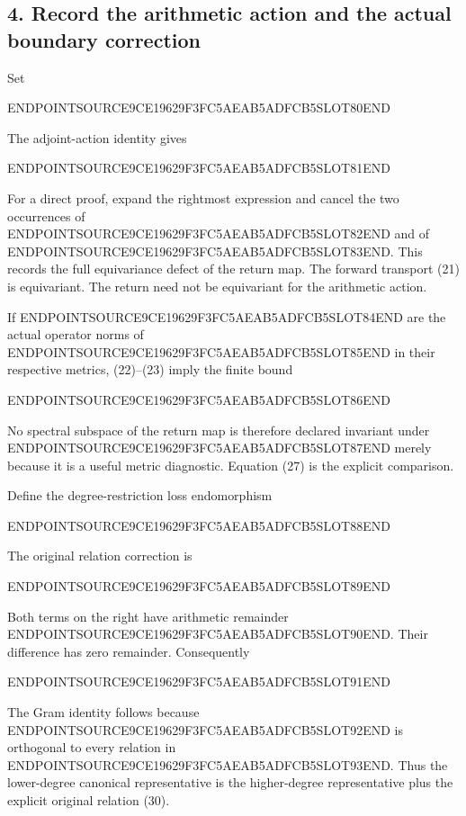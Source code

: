 \subsection{4. Record the arithmetic action and the actual boundary correction}\label{endpoint-restriction_original--record-the-arithmetic-action-and-the-actual-boundary-correction}

Set

ENDPOINTSOURCE9CE19629F3FC5AEAB5ADFCB5SLOT80END

The adjoint-action identity gives

ENDPOINTSOURCE9CE19629F3FC5AEAB5ADFCB5SLOT81END

For a direct proof, expand the rightmost expression and cancel the two occurrences of ENDPOINTSOURCE9CE19629F3FC5AEAB5ADFCB5SLOT82END and of ENDPOINTSOURCE9CE19629F3FC5AEAB5ADFCB5SLOT83END. This records the full equivariance defect of the return map. The forward transport (21) is equivariant. The return need not be equivariant for the arithmetic action.

If ENDPOINTSOURCE9CE19629F3FC5AEAB5ADFCB5SLOT84END are the actual operator norms of ENDPOINTSOURCE9CE19629F3FC5AEAB5ADFCB5SLOT85END in their respective metrics, (22)--(23) imply the finite bound

ENDPOINTSOURCE9CE19629F3FC5AEAB5ADFCB5SLOT86END

No spectral subspace of the return map is therefore declared invariant under ENDPOINTSOURCE9CE19629F3FC5AEAB5ADFCB5SLOT87END merely because it is a useful metric diagnostic. Equation (27) is the explicit comparison.

Define the degree-restriction loss endomorphism

ENDPOINTSOURCE9CE19629F3FC5AEAB5ADFCB5SLOT88END

The original relation correction is

ENDPOINTSOURCE9CE19629F3FC5AEAB5ADFCB5SLOT89END

Both terms on the right have arithmetic remainder ENDPOINTSOURCE9CE19629F3FC5AEAB5ADFCB5SLOT90END. Their difference has zero remainder. Consequently

ENDPOINTSOURCE9CE19629F3FC5AEAB5ADFCB5SLOT91END

The Gram identity follows because ENDPOINTSOURCE9CE19629F3FC5AEAB5ADFCB5SLOT92END is orthogonal to every relation in ENDPOINTSOURCE9CE19629F3FC5AEAB5ADFCB5SLOT93END. Thus the lower-degree canonical representative is the higher-degree representative plus the explicit original relation (30).


